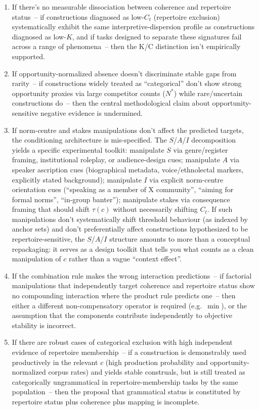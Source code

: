 \documentclass[12pt,letterpaper]{article}
\begin{document}
\begin{enumerate}
\item If there's no measurable dissociation between coherence and repertoire status~-- if constructions diagnosed as low-$C_t$ (repertoire exclusion) systematically exhibit the same interpretive-dispersion profile as constructions diagnosed as low-$K$, and if tasks designed to separate these signatures fail across a range of phenomena~-- then the K/C distinction isn't empirically supported.

\item If opportunity-normalized absence doesn't discriminate stable gaps from rarity~-- if constructions widely treated as \enquote{categorical} don't show strong opportunity proxies via large competitor counts ($N^{\ast}$) while rare/uncertain constructions do~-- then the central methodological claim about opportunity-sensitive negative evidence is undermined.

\item If norm-centre and stakes manipulations don't affect the predicted targets, the conditioning architecture is mis-specified. The $S$/$A$/$I$ decomposition yields a specific experimental toolkit: manipulate $S$ via genre/register framing, institutional roleplay, or audience-design cues; manipulate $A$ via speaker ascription cues (biographical metadata, voice/ethnolectal markers, explicitly stated background); manipulate $I$ via explicit norm-centre orientation cues (\enquote{speaking as a member of X community}, \enquote{aiming for formal norms}, \enquote{in-group banter}); manipulate stakes via consequence framing that should shift $\tau(c)$ without necessarily shifting $C_t$. If such manipulations don't systematically shift threshold behaviour (as indexed by anchor sets) and don't preferentially affect constructions hypothesized to be repertoire-sensitive, the $S$/$A$/$I$ structure amounts to more than a conceptual repackaging: it serves as a design toolkit that tells you what counts as a clean manipulation of $c$ rather than a vague \enquote{context effect}.

\item If the combination rule makes the wrong interaction predictions~-- if factorial manipulations that independently target coherence and repertoire status show no compounding interaction where the product rule predicts one~-- then either a different non-compensatory operator is required (e.g.\ $\min$), or the assumption that the components contribute independently to objective stability is incorrect.

\item If there are robust cases of categorical exclusion with high independent evidence of repertoire membership~-- if a construction is demonstrably used productively in the relevant $c$ (high production probability and opportunity-normalized corpus rates) and yields stable construals, but is still treated as categorically ungrammatical in repertoire-membership tasks by the same population~-- then the proposal that grammatical status is constituted by repertoire status plus coherence plus mapping is incomplete.
\end{enumerate}
\end{document}
